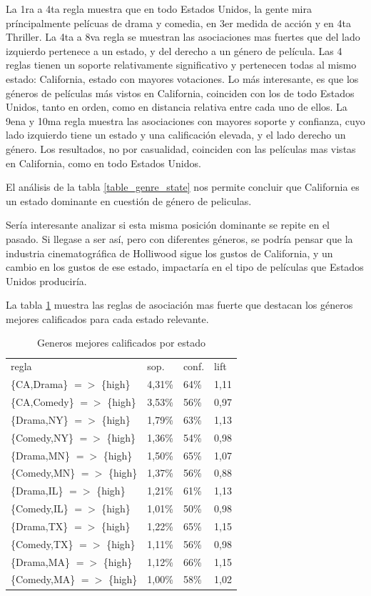 \documentclass[journal]{IEEEtran}
\begin{document}
La 1ra a 4ta regla muestra que en todo Estados Unidos, 
la gente mira príncipalmente pelícuas de drama y comedia, 
en 3er medida de acción y en 4ta  Thriller. 
La 4ta a 8va regla se muestran las asociaciones mas fuertes que del 
lado izquierdo pertenece a un estado, y del derecho a un género
de película. Las 4 reglas tienen un soporte relativamente significativo y
pertenecen todas al mismo estado: California, estado con mayores votaciones.
Lo más interesante, es que los géneros de películas más vistos en California,
coinciden con los de todo Estados Unidos, tanto en orden, como en distancia
relativa entre cada uno de ellos.
La 9ena y 10ma regla muestra las asociaciones con mayores soporte y confianza, cuyo
lado izquierdo tiene un estado y una calificación elevada, y el lado derecho
un género. Los resultados, no por casualidad, coinciden con las películas
mas vistas en California, como en todo Estados Unidos.

El análisis de la tabla \ref{table_genre_state} nos permite concluir que
California es un estado dominante en cuestión de género de peliculas. 

Sería interesante analizar si esta misma posición dominante se repite en el pasado.
Si llegase a ser así, pero con diferentes géneros, se podría pensar que la industria
cinematográfica de Holliwood sigue los gustos de California, y un cambio en los 
gustos de ese estado, impactaría en el tipo de películas que Estados Unidos produciría.

La tabla \ref{table_genre_state_high} muestra las reglas de asociación mas fuerte que
destacan los géneros mejores calificados para cada estado relevante.

\begin{table}[ht!]
\caption{Generos mejores calificados por estado}
\label{table_genre_state_high}
\centering
\begin{tabular}{l l l l }
regla & sop. & conf. & lift \\
\{CA,Drama\} $=$$>$ \{high\} & 4,31\% & 64\% & 1,11 \\
\{CA,Comedy\} $=$$>$ \{high\} & 3,53\% & 56\% & 0,97 \\
\{Drama,NY\} $=$$>$ \{high\} & 1,79\% & 63\% &  1,13 \\
\{Comedy,NY\} $=$$>$ \{high\} & 1,36\% & 54\% &  0,98 \\
\{Drama,MN\} $=$$>$ \{high\} & 1,50\% & 65\% &  1,07 \\
\{Comedy,MN\} $=$$>$ \{high\} & 1,37\% & 56\% &  0,88 \\
\{Drama,IL\} $=$$>$ \{high\} & 1,21\% & 61\% & 1,13 \\
\{Comedy,IL\} $=$$>$ \{high\} & 1,01\% & 50\% & 0,98 \\
\{Drama,TX\} $=$$>$ \{high\} & 1,22\% & 65\% & 1,15 \\
\{Comedy,TX\} $=$$>$ \{high\} & 1,11\% & 56\% & 0,98 \\
\{Drama,MA\} $=$$>$ \{high\} & 1,12\% & 66\% & 1,15 \\
\{Comedy,MA\} $=$$>$ \{high\} & 1,00\% & 58\% & 1,02 \\
\end{tabular}
\end{table}
\end{document}
